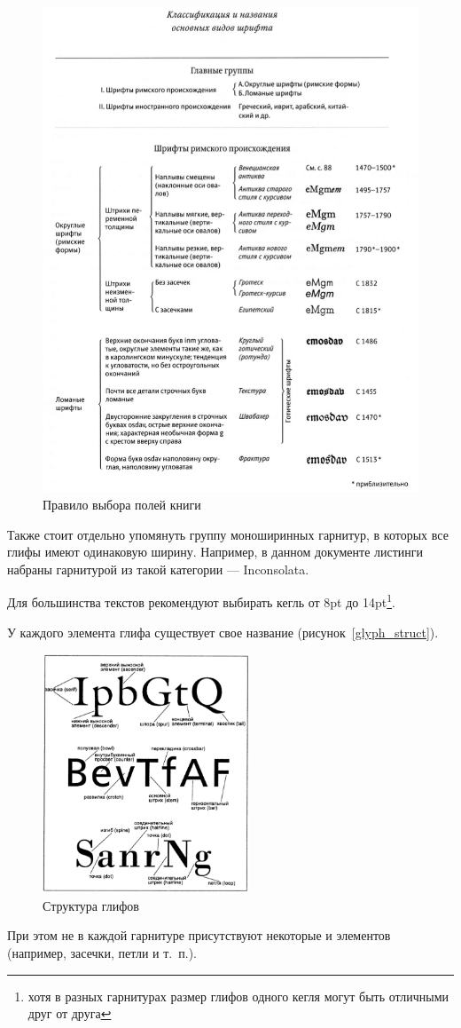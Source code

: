 \begin{figure}[H]
	\centering
	\includegraphics[width=\textwidth]{pics/fonts_class.png}
	\caption{Правило выбора полей книги}
	\label{fig:fonts_class}
\end{figure}

Также стоит отдельно упомянуть группу моноширинных гарнитур, в которых все глифы имеют одинаковую ширину. Например, в данном документе листинги набраны гарнитурой из такой категории --- Inconsolata.

Для большинства текстов рекомендуют выбирать кегль от 8pt до 14pt\footnote{хотя в разных гарнитурах размер глифов одного кегля могут быть отличными друг от друга}\cite{tschichold_aboutfont}.

У каждого элемента глифа существует свое название\cite{felichi_typo} (рисунок~\ref{glyph_struct}).

\begin{figure}[H]
	\centering
	\includegraphics[width=0.55\textwidth]{pics/glyph_struct.png}
	\caption{Структура глифов}
	\label{fig:glyph_struct}
\end{figure}

При этом не в каждой гарнитуре присутствуют некоторые и элементов (например, засечки, петли и т.~п.)\cite{korolkova_livetypo}.